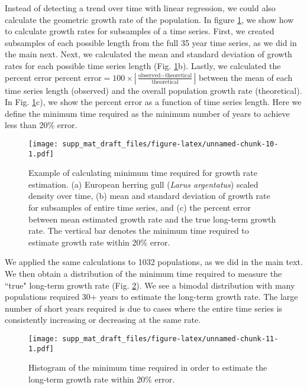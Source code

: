 \documentclass[12pt,]{article}
\begin{document}
Instead of detecting a trend over time with linear regression, we could
also calculate the geometric growth rate of the population. In figure
\ref{fig:growth_rate}, we show how to calculate growth rates for
subsamples of a time series. First, we created subsamples of each
possible length from the full 35 year time series, as we did in the main
next. Next, we calculated the mean and standard deviation of growth
rates for each possible time series length (Fig.
\ref{fig:growth_rate}b). Lastly, we calculated the percent error
\(\mbox{percent error} = 100 \times \left| \frac{\mbox{observed} - \mbox{theoretical}}{\mbox{theoretical}} \right|\)
between the mean of each time series length (observed) and the overall
population growth rate (theoretical). In Fig. \ref{fig:growth_rate}c),
we show the percent error as a function of time series length. Here we
define the minimum time required as the minimum number of years to
achieve less than 20\% error.

\begin{figure}[htbp]
\centering
\texttt{[image: supp\_mat\_draft\_files/figure-latex/unnamed-chunk-10-1.pdf]}
\caption{Example of calculating minimum time required for growth rate
estimation. (a) European herring gull (\emph{Larus argentatus}) scaled
density over time, (b) mean and standard deviation of growth rate for
subsamples of entire time series, and (c) the percent error between mean
estimated growth rate and the true long-term growth rate. The vertical
bar denotes the minimum time required to estimate growth rate within
20\% error.\label{fig:growth_rate}}
\end{figure}

We applied the same calculations to 1032 populations, as we did in the
main text. We then obtain a distribution of the minimum time required to
measure the ``true" long-term growth rate (Fig.
\ref{fig:min_time_growth_dist}). We see a bimodal distribution with many
populations required 30+ years to estimate the long-term growth rate.
The large number of short years required is due to cases where the
entire time series is consistently increasing or decreasing at the same
rate.

\begin{figure}[htbp]
\centering
\texttt{[image: supp\_mat\_draft\_files/figure-latex/unnamed-chunk-11-1.pdf]}
\caption{Histogram of the minimum time required in order to estimate the
long-term growth rate within 20\%
error.\label{fig:min_time_growth_dist}}
\end{figure}
\end{document}
